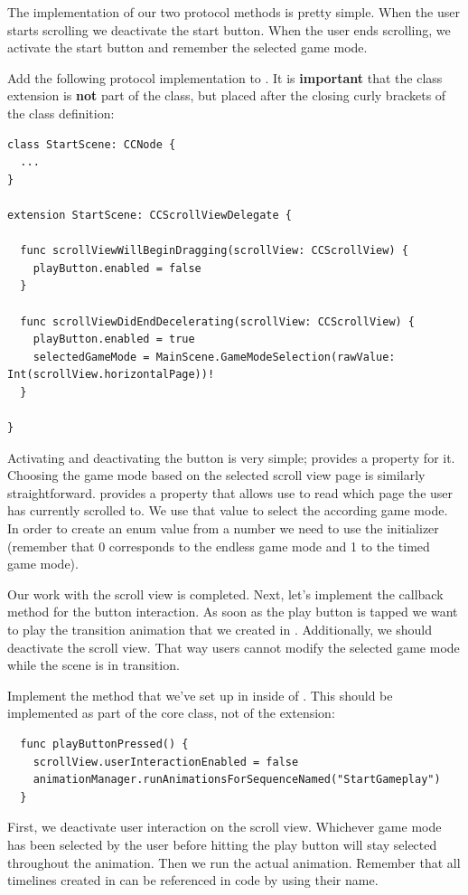 The implementation of our two protocol methods is pretty simple. When the user
starts scrolling we deactivate the start button. When the user ends scrolling,
we activate the start button and remember the selected game mode.
\begin{leftbar}
Add the following protocol implementation to . It
is \textbf{important} that the class extension is \textbf{not} part of the
class, but placed after the closing curly brackets of the class definition:
\begin{lstlisting}
class StartScene: CCNode {
  ...  
}

extension StartScene: CCScrollViewDelegate {
  
  func scrollViewWillBeginDragging(scrollView: CCScrollView) {
    playButton.enabled = false
  }
  
  func scrollViewDidEndDecelerating(scrollView: CCScrollView) {
    playButton.enabled = true
    selectedGameMode = MainScene.GameModeSelection(rawValue: Int(scrollView.horizontalPage))!
  }
  
}
\end{lstlisting}
\end{leftbar}
Activating and deactivating the button is very simple; 
provides a property for it. Choosing the game mode based on the selected scroll
view page is similarly straightforward.  provides a
 property that allows use to read which page the user
has currently scrolled to. We use that value to select the according game mode.
In order to create an enum value from a number we need to use the
 initializer (remember that 0 corresponds to the endless
game mode and 1 to the timed game mode).

Our work with the scroll view is completed. Next, let's implement the callback
method for the button interaction. As soon as the play button is tapped we want
to play the transition animation that we created in \SB{}. Additionally, we
should deactivate the scroll view. That way users cannot modify the selected
game mode while the scene is in transition.

\begin{leftbar}
Implement the  method that we've set up in \SB{}
inside of . This should be implemented as part of the
core class, not of the extension:
\begin{lstlisting}
  func playButtonPressed() {
    scrollView.userInteractionEnabled = false
    animationManager.runAnimationsForSequenceNamed("StartGameplay")
  }
\end{lstlisting}
\end{leftbar}
First, we deactivate user interaction on the scroll view. Whichever game mode
has been selected by the user before hitting the play button will stay selected
throughout the animation. Then we run the actual animation. Remember that all
timelines created in \SB{} can be referenced in code by using their name.

